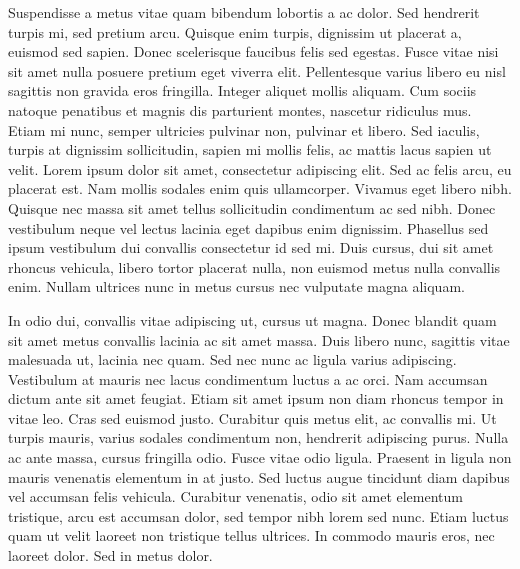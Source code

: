 Suspendisse a metus vitae quam bibendum lobortis a ac dolor. Sed
hendrerit turpis mi, sed pretium arcu. Quisque enim turpis, dignissim
ut placerat a, euismod sed sapien. Donec scelerisque faucibus felis
sed egestas. Fusce vitae nisi sit amet nulla posuere pretium eget
viverra elit. Pellentesque varius libero eu nisl sagittis non gravida
eros fringilla. Integer aliquet mollis aliquam. Cum sociis natoque
penatibus et magnis dis parturient montes, nascetur ridiculus
mus. Etiam mi nunc, semper ultricies pulvinar non, pulvinar et
libero. Sed iaculis, turpis at dignissim sollicitudin, sapien mi
mollis felis, ac mattis lacus sapien ut velit. Lorem ipsum dolor sit
amet, consectetur adipiscing elit. Sed ac felis arcu, eu placerat
est. Nam mollis sodales enim quis ullamcorper. Vivamus eget libero
nibh. Quisque nec massa sit amet tellus sollicitudin condimentum ac
sed nibh. Donec vestibulum neque vel lectus lacinia eget dapibus enim
dignissim. Phasellus sed ipsum vestibulum dui convallis consectetur id
sed mi. Duis cursus, dui sit amet rhoncus vehicula, libero tortor
placerat nulla, non euismod metus nulla convallis enim. Nullam
ultrices nunc in metus cursus nec vulputate magna aliquam.

In odio dui, convallis vitae adipiscing ut, cursus ut magna. Donec
blandit quam sit amet metus convallis lacinia ac sit amet massa. Duis
libero nunc, sagittis vitae malesuada ut, lacinia nec quam. Sed nec
nunc ac ligula varius adipiscing. Vestibulum at mauris nec lacus
condimentum luctus a ac orci. Nam accumsan dictum ante sit amet
feugiat. Etiam sit amet ipsum non diam rhoncus tempor in vitae
leo. Cras sed euismod justo. Curabitur quis metus elit, ac convallis
mi. Ut turpis mauris, varius sodales condimentum non, hendrerit
adipiscing purus. Nulla ac ante massa, cursus fringilla odio. Fusce
vitae odio ligula. Praesent in ligula non mauris venenatis elementum
in at justo. Sed luctus augue tincidunt diam dapibus vel accumsan
felis vehicula. Curabitur venenatis, odio sit amet elementum
tristique, arcu est accumsan dolor, sed tempor nibh lorem sed
nunc. Etiam luctus quam ut velit laoreet non tristique tellus
ultrices. In commodo mauris eros, nec laoreet dolor. Sed in metus
dolor.

